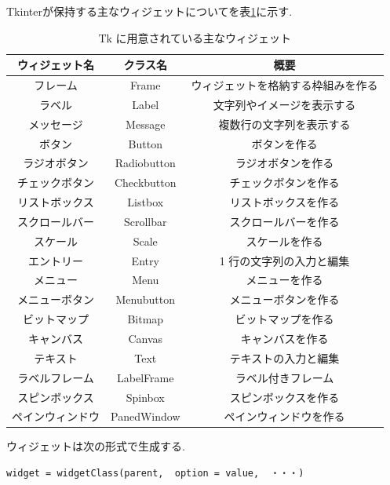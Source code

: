\documentclass[dvipdfmx]{jsarticle}
\begin{document}
Tkinterが保持する主なウィジェットについてを表\ref{Tk}に示す.
\begin{table}[H]
    \centering
    \begin{tabular}{|c|c|c|}
    \hline
    \textbf{ウィジェット名} & \textbf{クラス名	}  & \multicolumn{1}{c|}{\textbf{概要}} \\
    \hline
    フレーム & Frame & ウィジェットを格納する枠組みを作る \\
    \hline
    ラベル & Label & 文字列やイメージを表示する \\
    \hline
    メッセージ & Message & 複数行の文字列を表示する \\
    \hline
    ボタン & Button & ボタンを作る \\
    \hline
    ラジオボタン & Radiobutton & ラジオボタンを作る \\
    \hline
    チェックボタン & Checkbutton & チェックボタンを作る \\
    \hline
    リストボックス & Listbox & リストボックスを作る \\
    \hline
    スクロールバー & Scrollbar & スクロールバーを作る \\
    \hline
    スケール & Scale & スケールを作る \\
    \hline
    エントリー & Entry & 1 行の文字列の入力と編集 \\
    \hline
    メニュー & Menu & メニューを作る \\
    \hline
    メニューボタン & Menubutton & メニューボタンを作る \\
    \hline
    ビットマップ & Bitmap & ビットマップを作る \\
    \hline
    キャンバス & Canvas & キャンバスを作る \\
    \hline
    テキスト & Text & テキストの入力と編集 \\
    \hline
    ラベルフレーム & LabelFrame & ラベル付きフレーム \\
    \hline
    スピンボックス & Spinbox & スピンボックスを作る \\
    \hline
    ペインウィンドウ & PanedWindow & ペインウィンドウを作る \\
    \hline
    \end{tabular}
    \caption{Tk に用意されている主なウィジェット}
    \label{Tk}
\end{table}

ウィジェットは次の形式で生成する.

\begin{lstlisting}
widget = widgetClass(parent,  option = value,  ・・・)
\end{lstlisting}
\end{document}
